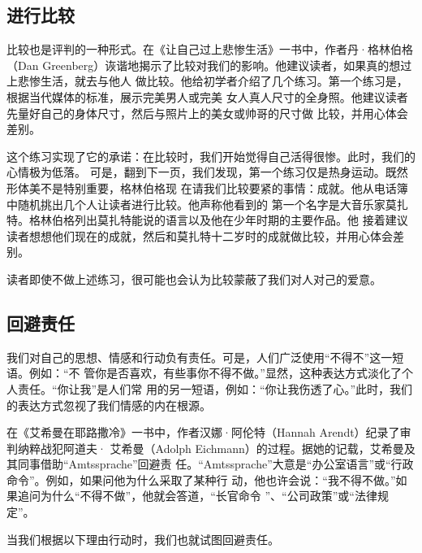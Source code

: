 \documentclass{ctexart}
\begin{document}
\subsection{进行比较}

比较也是评判的一种形式。在《让自己过上悲惨生活》一书中，作者丹·格林伯格（Dan
Greenberg）诙谐地揭示了比较对我们的影响。他建议读者，如果真的想过上悲惨生活，就去与他人
做比较。他给初学者介绍了几个练习。第一个练习是，根据当代媒体的标准，展示完美男人或完美
女人真人尺寸的全身照。他建议读者先量好自己的身体尺寸，然后与照片上的美女或帅哥的尺寸做
比较，并用心体会差别。

这个练习实现了它的承诺：在比较时，我们开始觉得自己活得很惨。此时，我们的心情极为低落。
可是，翻到下一页，我们发现，第一个练习仅是热身运动。既然形体美不是特别重要，格林伯格现
在请我们比较要紧的事情：成就。他从电话簿中随机挑出几个人让读者进行比较。他声称他看到的
第一个名字是大音乐家莫扎特。格林伯格列出莫扎特能说的语言以及他在少年时期的主要作品。他
接着建议读者想想他们现在的成就，然后和莫扎特十二岁时的成就做比较，并用心体会差别。

读者即使不做上述练习，很可能也会认为比较蒙蔽了我们对人对己的爱意。


\subsection{回避责任}

我们对自己的思想、情感和行动负有责任。可是，人们广泛使用``不得不''这一短语。例如：``不
管你是否喜欢，有些事你不得不做。''显然，这种表达方式淡化了个人责任。``你让我''是人们常
用的另一短语，例如：``你让我伤透了心。''此时，我们的表达方式忽视了我们情感的内在根源。

在《艾希曼在耶路撒冷》一书中，作者汉娜·阿伦特（Hannah Arendt）纪录了审判纳粹战犯阿道夫·
艾希曼（Adolph Eichmann）的过程。据她的记载，艾希曼及其同事借助``Amtssprache''回避责
任。``Amtssprache''大意是``办公室语言''或``行政命令''。例如，如果问他为什么采取了某种行
动，他也许会说：``我不得不做。''如果追问为什么``不得不做''，他就会答道，``长官命令
''、``公司政策''或``法律规定''。

当我们根据以下理由行动时，我们也就试图回避责任。
\end{document}
